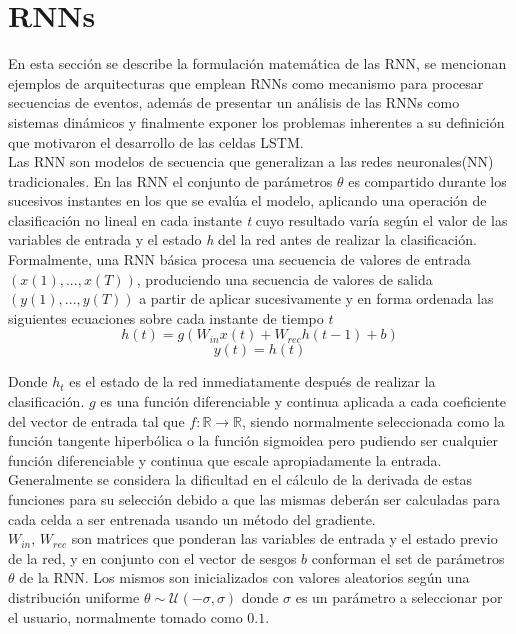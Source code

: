 \documentclass{article}
\begin{document}
	\pagebreak
	\section{RNNs}\label{sectionRNN}
	En esta sección se describe la formulación matemática de las RNN, se mencionan ejemplos de arquitecturas que emplean RNNs como mecanismo para procesar secuencias de eventos, además de presentar un análisis de las RNNs como sistemas dinámicos y finalmente exponer los problemas inherentes a su definición que motivaron el desarrollo de las celdas LSTM.\\
	Las RNN son modelos de secuencia que generalizan a las redes neuronales(NN) tradicionales\cite{19IntroductionRNN}. En las RNN el conjunto de parámetros $\theta$ es compartido durante los sucesivos instantes en los que se evalúa el modelo, aplicando una operación de clasificación no lineal en cada instante \textit{t} cuyo resultado varía según el valor de las variables de entrada y el estado \textit{h} del la red antes de realizar la clasificación.\\ 
	
	Formalmente, una RNN básica procesa una secuencia de valores de entrada \textit{$(x(1) , ... , x(T))$}, produciendo una secuencia de valores de salida \textit{ $(y(1), ... , y(T))$} a partir de aplicar sucesivamente y en forma ordenada las siguientes ecuaciones sobre cada instante de tiempo $t$ 
	\begin{equation}\label{RNN}
	h(t) = g( W_{in} x(t) + W_{rec} h(t-1) + b )
	\end{equation}
	\begin{equation*}
	y(t) = h(t)
	\end{equation*}
	
	Donde $h_{t}$ es el estado de la red inmediatamente después de realizar la clasificación. $g$ es una función diferenciable y continua aplicada a cada coeficiente del vector de entrada tal que $f: \mathbb{R} \rightarrow \mathbb{R}$, siendo normalmente seleccionada como la función tangente hiperbólica o la función sigmoidea pero pudiendo ser cualquier función diferenciable y continua que escale apropiadamente la entrada. \\
	Generalmente se considera la dificultad en el cálculo de la derivada de estas funciones para su selección debido a que las mismas deberán ser calculadas para cada celda a ser entrenada usando un método del gradiente.\\
	$W_{in}$, $W_{rec}$ son matrices que ponderan las variables de entrada y el estado previo de la red, y en conjunto con el vector de sesgos $b$ conforman el set de parámetros $\theta$ de la RNN. Los mismos son inicializados con valores aleatorios según una distribución uniforme $\theta \sim \mathcal{U}(-\sigma, \sigma)$ donde $\sigma$ es un parámetro a seleccionar por el usuario, normalmente tomado como $0.1$.\\
	
\end{document}
